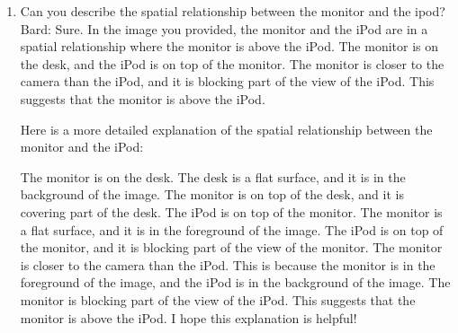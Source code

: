 \begin{enumerate}
    \item Can you describe the spatial relationship between the monitor and the ipod?
    \subitem Bard: 
    Sure. In the image you provided, the monitor and the iPod are in a spatial relationship where the monitor is above the iPod. The monitor is on the desk, and the iPod is on top of the monitor. The monitor is closer to the camera than the iPod, and it is blocking part of the view of the iPod. This suggests that the monitor is above the iPod.
    
    Here is a more detailed explanation of the spatial relationship between the monitor and the iPod:
    
    The monitor is on the desk. The desk is a flat surface, and it is in the background of the image. The monitor is on top of the desk, and it is covering part of the desk.
    The iPod is on top of the monitor. The monitor is a flat surface, and it is in the foreground of the image. The iPod is on top of the monitor, and it is blocking part of the view of the monitor.
    The monitor is closer to the camera than the iPod. This is because the monitor is in the foreground of the image, and the iPod is in the background of the image.
    The monitor is blocking part of the view of the iPod. This suggests that the monitor is above the iPod.
    I hope this explanation is helpful!
    

\end{enumerate}
